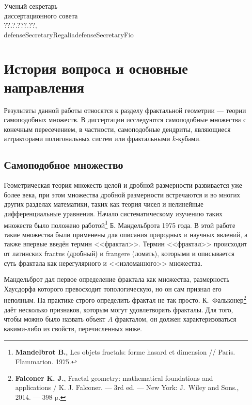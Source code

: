 \documentclass[a5paper,9pt,twoside]{extarticle} %
\begin{document}
\vspace{0.008\paperheight plus1fill}


\vspace{0.008\paperheight plus1fill}
\noindent
Ученый секретарь\\
диссертационного совета\\
??.?.???.??,\\
defenseSecretaryRegalia\hfill defenseSecretaryFio

\newpage

\section{История вопроса и основные направления}
Результаты данной работы относятся к разделу фрактальной геометрии --- теории самоподобных множеств.
В диссертации исследуются самоподобные множества с конечным пересечением, в частности, самоподобные дендриты, являющиеся аттракторами полигональных систем или фрактальными $k$-кубами.
\subsection{Самоподобное множество}

Геометрическая теория множеств целой и дробной размерности развивается уже более века, при этом множества дробной размерности встречаются и во многих других разделах математики, таких как теория чисел и нелинейные дифференциальные уравнения.
Начало систематическому изучению таких множеств было положено работой\footnote{{\bf Mandelbrot B.}, Les objets fractals: forme hasard et dimension // Paris. Flammarion. 1975.} Б. Мандельброта 1975 года.
В этой работе такие множества были применены для описания природных и научных явлений, а также впервые введён термин <<фрактал>>.
Термин <<фрактал>> происходит от латинских fractus (дробный) и frangere (ломать), которыми и описывается суть фрактала как нерегулярного и <<изломанного>> множества.

Мандельброт дал первое определение фрактала как множества, размерность Хаусдорфа которого превосходит топологическую, но он сам признал его неполным.
На практике строго определить фрактал не так просто.
К.~Фальконер\footnote{{\bf Falconer K. J.}, Fractal geometry: mathematical foundations and applications / K. J. Falconer. --- 3rd ed. --- New York: J.~Wiley and Sons., 2014. --- 398 p.} даёт несколько признаков, которым могут удовлетворять фракталы.
Для того, чтобы можно было назвать объект $A$ фракталом, он должен характеризоваться какими-либо из свойств, перечисленных ниже.
\end{document}
